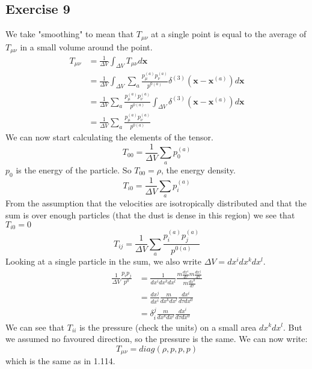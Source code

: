 \subsection{Exercise 9}
We take "smoothing" to mean that $T_{\mu\nu}$  at a single point is equal to the average of $T_{\mu\nu}$ in a small volume around the point.
\begin{align}
    T_{\mu\nu} &= \frac{1}{\Delta V} \int_{\Delta V} T_{\mu\nu} d\boldsymbol{x} \\
    &= \frac{1}{\Delta V} \int_{\Delta V} \sum_a\frac{p_\mu^{(a)}p_\nu^{(a)}}{p^{0(a)}} \delta^{(3)} (\boldsymbol{x}-\boldsymbol{x}^{(a)})d\boldsymbol{x} \\
    &= \frac{1}{\Delta V} \sum_a \frac{p_\mu^{(a)}p_\nu^{(a)}}{p^{0(a)}} \int_{\Delta V} \delta^{(3)} (\boldsymbol{x}-\boldsymbol{x}^{(a)})d\boldsymbol{x} \\
    &= \frac{1}{\Delta V} \sum_a \frac{p_\mu^{(a)}p_\nu^{(a)}}{p^{0(a)}}
\end{align}
We can now start calculating the elements of the tensor.
\begin{equation}
    T_{00} = \frac{1}{\Delta V} \sum_a p^{(a)}_0
\end{equation}
$p_0$ is the energy of the particle. So $T_{00}=\rho$, the energy density.
\begin{equation}
    T_{i0} = \frac{1}{\Delta V} \sum_a p^{(a)}_i
\end{equation}
From the assumption that the velocities are isotropically distributed and that the sum is over enough particles (that the dust is dense in this region) we see that $T_{i0}=0$
\begin{equation}
    T_{ij} =  \frac{1}{\Delta V} \sum_a \frac{p_i^{(a)}p_j^{(a)}}{p^{0(a)}}
\end{equation}
Looking at a single particle in the sum, we also write $\Delta V=dx^idx^kdx^l$.
\begin{align}
    \frac{1}{\Delta V} \frac{p_ip_j}{p^{0}} &= \frac{1}{dx^idx^kdx^l} \frac{m\frac{dx^i}{d\tau} m\frac{dx^j}{d\tau}}{m\frac{dx^0}{d\tau}} \\
    &= \frac{dx^j}{dx^i} \frac{m}{dx^kdx^l} \frac{dx^i}{d\tau dx^0} \\
    &= \delta_i^j \frac{m}{dx^kdx^l} \frac{dx^i}{d\tau dx^0}
\end{align}
We can see that $T_{ii}$ is the pressure (check the units) on a small area $dx^kdx^l$. But we assumed no favoured direction, so the pressure is the same.
We can now write:
\begin{equation}
    T_{\mu\nu} = diag(\rho,p,p,p)
\end{equation}
which is the same as in 1.114.